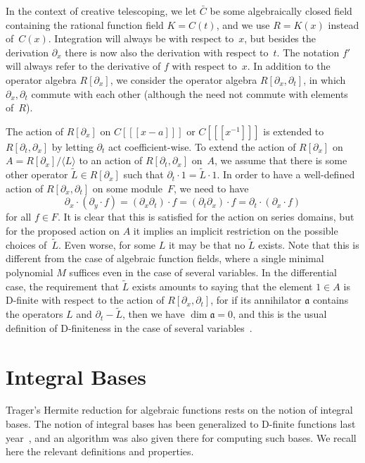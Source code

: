 \documentclass{sig-alternate}
\def\<#1>{\langle#1\rangle}
\begin{document}
In the context of creative telescoping, we let $\bar C$ be some algebraically
closed field containing the rational function field $K=C(t)$, and we
use $R=K(x)$ instead of~$C(x)$. Integration will always be with respect to~$x$, but
besides the derivation $\partial_x$ there is now also the derivation with respect
to~$t$. The notation $f'$ will always refer to the derivative of $f$
with respect to~$x$. In addition to the operator algebra $R[\partial_x]$, we consider the
operator algebra $R[\partial_x,\partial_t]$, in which $\partial_x,\partial_t$
commute with each other (although the need not commute with elements of~$R$). 

The action of $R[\partial_x]$ on $C[[[x-a]]]$ or $C[[[x^{-1}]]]$ is extended
to $R[\partial_t,\partial_x]$ by letting $\partial_t$ act coefficient-wise.
To extend the action of $R[\partial_x]$ on $A=R[\partial_x]/\<L>$ to an action of
$R[\partial_t,\partial_x]$ on~$A$, we assume that there is some other
operator $\tilde L\in R[\partial_x]$ such that $\partial_t\cdot1=\tilde L\cdot 1$.
In order to have a well-defined action of $R[\partial_x,\partial_t]$ on some module~$F$,
we need to have
\[
\partial_x\cdot(\partial_y\cdot f)=(\partial_x\partial_t)\cdot f=(\partial_t\partial_x)\cdot f=\partial_t\cdot(\partial_x\cdot f)
\]
for all $f\in F$. It is clear that this is satisfied for the action on series domains,
but for the proposed action on $A$ it implies an implicit restriction on the possible
choices of~$\tilde L$. Even worse, for some $L$ it may be that no $\tilde L$ exists.
Note that this is different from the case of algebraic function fields, where a single minimal polynomial $M$
suffices even in the case of several variables.
In the differential case, the requirement that $\tilde L$ exists amounts to saying that the element $1\in A$ is
D-finite with respect to the action of $R[\partial_x,\partial_t]$, for if its annihilator $\mathfrak{a}$
contains the operators $L$ and $\partial_t-\tilde L$, then we have $\dim\mathfrak{a}=0$, and this is the usual
definition of D-finiteness in the case of several variables~\cite{zeilberger90,chyzak98,koutschan09,kauers14c}.

\section{Integral Bases}

Trager's Hermite reduction for algebraic functions rests on the notion of
integral bases. The notion of integral bases has been generalized to D-finite
functions last year~\cite{kauers15b}, and an algorithm was also given there for
computing such bases. We recall here the relevant definitions and properties.
\end{document}

